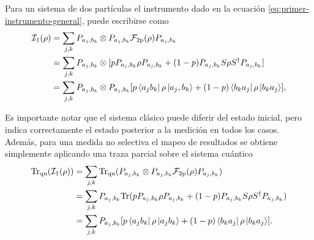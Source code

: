 Para un sistema de dos partículas el instrumento dado en la ecuación {\eqref{eq:primer-instrumento-general}}, puede escribirse como\begin{equation}\label{eq:fisrtinstrument2p}
    \begin{split}
        \mathcal{I}_1{(\rho)}&=\sum_{j,k}P_{a_j,b_k}\otimes P_{a_j,b_k} \mathcal{F}_{2\text{p}}(\rho) P_{a_j,b_k}\\
        &=\sum_{j,k}P_{a_j,b_k}\otimes[p P_{a_j,b_k}\rho P_{a_j,b_k}+(1-p)P_{a_j,b_k}S\rho S^\dagger P_{a_j,b_k}]\\
        &=\sum_{j,k}P_{a_j,b_k}\otimes P_{a_j,b_k} [p \bra{a_j b_k}\rho \ket{a_j,b_k}+(1-p)\bra{b_k a_j }\rho \ket {b_k a_j}],
\end{split}
\end{equation}




% 

Es importante notar que el sistema clásico  puede diferir del estado inicial, pero  indica correctamente el estado posterior a la medición en todos los casos. Además, para una medida no selectiva el mapeo de resultados se obtiene simplemente aplicando una traza parcial sobre el sistema cuántico 
\begin{equation}\label{eq:traza_q_1instrument2p}
    \begin{split}
        {\rm Tr}_{\text{qu}}(\mathcal{I}_1{(\rho)})&=\sum_{j,k}{\rm Tr}_{\text{qu}}(P_{a_j,b_k}\otimes P_{a_j,b_k} \mathcal{F}_{2\text{p}}(\rho) P_{a_j,b_k})\\
        &=\sum_{j,k}P_{a_j,b_k}{\rm Tr}(p P_{a_j,b_k}\rho P_{a_j,b_k}+(1-p)P_{a_j,b_k}S\rho S^\dagger P_{a_j,b_k})\\
        &=\sum_{j,k}P_{a_j,b_k}[p \bra{a_j b_k}\rho\ket{a_j b_k} +(1-p)\bra{b_k a_j}\rho \ket{b_k a_j}].
\end{split}
\end{equation} 


